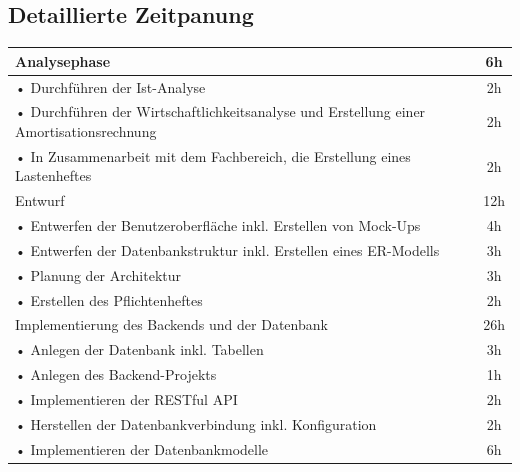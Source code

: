 \documentclass[a4paper,12pt]{article}
\begin{document}
\subsection{Detaillierte Zeitpanung}
\label{sec:detaillierte zeitplanung}
\begin{tabular}{|p{\textwidth}|c|}
    \hline
    \rowcolor{gray}Analysephase & 6h \\
    \hline
    \hspace{0.5cm}• Durchführen der Ist-Analyse &2h \\
    \hline
    \hspace{0.5cm}• Durchführen der Wirtschaftlichkeitsanalyse und Erstellung einer Amortisationsrechnung & 2h \\
    \hline
    \hspace{0.5cm}• In Zusammenarbeit mit dem Fachbereich, die Erstellung eines Lastenheftes  & 2h \\
    \hline
    \rowcolor{gray}Entwurf & 12h \\
    \hline
    \hspace{0.5cm}• Entwerfen der Benutzeroberfläche inkl. Erstellen von Mock-Ups & 4h \\
    \hline
    \hspace{0.5cm}• Entwerfen der Datenbankstruktur inkl. Erstellen eines ER-Modells & 3h \\
    \hline
    \hspace{0.5cm}• Planung der Architektur  & 3h \\
    \hline
    \hspace{0.5cm}• Erstellen des Pflichtenheftes & 2h \\
    \hline
    \rowcolor{gray}Implementierung des Backends und der Datenbank & 26h \\
    \hline
    \hspace{0.5cm}• Anlegen der Datenbank inkl. Tabellen & 3h \\
    \hline
    \hspace{0.5cm}• Anlegen des Backend-Projekts & 1h \\
    \hline
    \hspace{0.5cm}• Implementieren der RESTful API & 2h \\
    \hline
    \hspace{0.5cm}• Herstellen der Datenbankverbindung inkl. Konfiguration & 2h \\
    \hline
    \hspace{0.5cm}• Implementieren der Datenbankmodelle & 6h \\
    \hline

\end{tabular}
\end{document}
